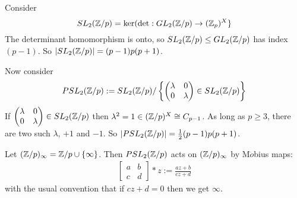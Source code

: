 \documentclass[a4paper]{article}
\begin{document}
\begin{eg}
Consider $$SL_2 (\mathbb{Z}/p) = \ker(\det: GL_2(\mathbb{Z}/p) \to (\mathbb{Z}_p)^X\}$$ 
The determinant homomorphism is onto, so $SL_2(\mathbb{Z}/p) \leq GL_2(\mathbb{Z}/p)$ has index $(p-1)$. So $|SL_2(\mathbb{Z}/p)| = (p-1)p(p+1)$.

Now consider
\begin{equation*}
\begin{aligned}
PSL_2(\mathbb{Z}/p) := SL_2(\mathbb{Z}/p) / \left\{\left(\begin{matrix}
\lambda & 0 \\
0 & \lambda
\end{matrix}\right) \in SL_2(\mathbb{Z}/p)\right\}
\end{aligned}
\end{equation*}
If $\left(\begin{matrix}
\lambda & 0\\
0 & \lambda
\end{matrix}\right) \in SL_2(\mathbb{Z} /p)$ then $\lambda^2 = 1 \in (\mathbb{Z}/p)^X \cong C_{p-1}$. As long as $p \geq 3$, there are two such $\lambda$, $+1$ and $-1$. So $|PSL_2(\mathbb{Z}/p)| =\frac{1}{2} (p-1)p(p+1)$.

Let $(\mathbb{Z}/p)_\infty =\mathbb{Z}/p \cup \{\infty\}$. Then $PSL_2 (\mathbb{Z}/p)$ acts on $(\mathbb{Z}/p)_\infty$ by M$\ddot{o}$bius maps:
\begin{equation*}
\begin{aligned}
\left[\begin{matrix}
a & b\\
c & d
\end{matrix} \right] * z := \frac{az+b}{cz+d}
\end{aligned}
\end{equation*}
with the usual convention that if $cz+d=0$ then we get $\infty$.
\end{eg}
\end{document}
